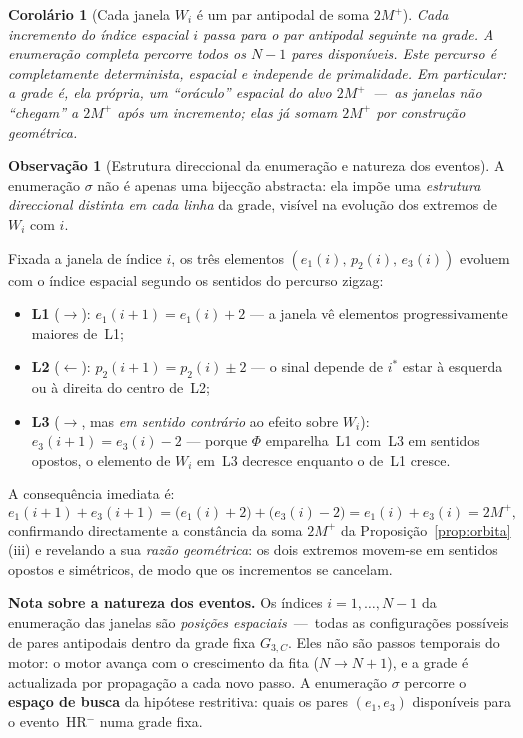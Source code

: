 \documentclass[12pt, a4paper]{article}
\theoremstyle{plain}
\newtheorem{corollary}[theorem]{Corolário}
\theoremstyle{definition}
\newtheorem{remark}[theorem]{Observação}
\theoremstyle{remark}
\begin{document}
	\begin{corollary}[Cada janela $W_i$ é um par antipodal de soma $2M^+$]
		\label{cor:sigma-desloc}
		Cada incremento do índice espacial $i$ passa para o par antipodal
		seguinte na grade.  A enumeração completa percorre todos os $N-1$
		pares disponíveis.  Este percurso é completamente determinista,
		espacial e independe de primalidade.  Em particular: a grade é,
		ela própria, um ``oráculo'' espacial do alvo $2M^+$~---~as janelas
		não ``chegam'' a $2M^+$ após um incremento; elas \emph{já somam}
		$2M^+$ por construção geométrica.
	\end{corollary}
	
	\begin{remark}[Estrutura direccional da enumeração e natureza dos eventos]
		\label{rem:sigma-direcoes}
		A enumeração $\sigma$ não é apenas uma bijecção abstracta: ela
		impõe uma \emph{estrutura direccional distinta em cada linha}
		da grade, visível na evolução dos extremos de $W_i$ com $i$.
		
		Fixada a janela de índice $i$, os três elementos $(e_1(i),\,p_2(i),\,e_3(i))$
		evoluem com o índice espacial segundo os sentidos do percurso zigzag:
		\begin{itemize}
			\item \textbf{L1} ($\rightarrow$):
			$e_1(i{+}1)=e_1(i)+2$
			--- a janela vê elementos progressivamente maiores de~L1;
			\item \textbf{L2} ($\leftarrow$):
			$p_2(i{+}1)=p_2(i)\pm2$
			--- o sinal depende de $i^*$ estar à esquerda ou à direita
			do centro de~L2;
			\item \textbf{L3} ($\rightarrow$, mas \emph{em sentido contrário}
			ao efeito sobre $W_i$):
			$e_3(i{+}1)=e_3(i)-2$
			--- porque $\Phi$ emparelha~L1 com~L3 em sentidos opostos,
			o elemento de $W_i$ em~L3 decresce enquanto o de~L1 cresce.
		\end{itemize}
		A consequência imediata é:
		\[
		e_1(i{+}1)+e_3(i{+}1)
		=\bigl(e_1(i)+2\bigr)+\bigl(e_3(i)-2\bigr)
		=e_1(i)+e_3(i) = 2M^+,
		\]
		confirmando directamente a constância da soma $2M^+$ da
		Proposição~\ref{prop:orbita}(iii) e revelando a sua
		\emph{razão geométrica}: os dois extremos movem-se em sentidos
		opostos e simétricos, de modo que os incrementos se cancelam.
		
		\medskip
		\noindent\textbf{Nota sobre a natureza dos eventos.}
		Os índices $i=1,\ldots,N-1$ da enumeração das janelas são
		\emph{posições espaciais}~---~todas as configurações possíveis de
		pares antipodais dentro da grade fixa $G_{3,C}$.  Eles não são passos
		temporais do motor: o motor avança com o crescimento da fita
		($N\to N{+}1$), e a grade é actualizada por propagação a cada
		novo passo.  A enumeração $\sigma$ percorre o
		\textbf{espaço de busca} da hipótese restritiva: quais os pares
		$(e_1,e_3)$ disponíveis para o evento~HR$^-$ numa grade fixa.
	\end{remark}
	
\end{document}
